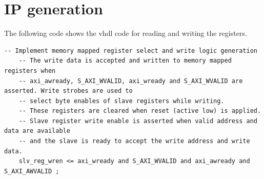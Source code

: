 \documentclass[11pt, a4paper]{report}
\begin{document}
\section{IP generation}
The following code shows the vhdl code for reading and writing the registers. 
\begin{verbatim}
-- Implement memory mapped register select and write logic generation
	-- The write data is accepted and written to memory mapped registers when
	-- axi_awready, S_AXI_WVALID, axi_wready and S_AXI_WVALID are asserted. Write strobes are used to
	-- select byte enables of slave registers while writing.
	-- These registers are cleared when reset (active low) is applied.
	-- Slave register write enable is asserted when valid address and data are available
	-- and the slave is ready to accept the write address and write data.
	slv_reg_wren <= axi_wready and S_AXI_WVALID and axi_awready and S_AXI_AWVALID ;


\end{verbatim}
\end{document}
